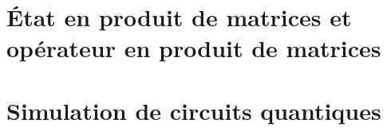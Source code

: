 









\section{État en produit de matrices et opérateur en produit de matrices}






\section{Simulation de circuits quantiques}

\begin{comment}
\subsection*{Plan}

\begin{enumerate}
    \item Décrire le lien entre les circuits quantiques et les réseaux de tenseurs
    \item Décrire les différentes méthodes de simulation (MPS-MPO et réseau de tenseurs général)
    \item Décrire la méthode d'échantillonage
\end{enumerate}

\subsection*{Références}

1. Gray, J. quimb: A python package for quantum information and many-body calculations. Journal of Open Source Software 3, 819 (2018).

2. Ferris, A. J. and Vidal, G. Perfect Sampling with Unitary Tensor Networks. Phys. Rev. B 85, 165146 (2012).
\end{comment}


